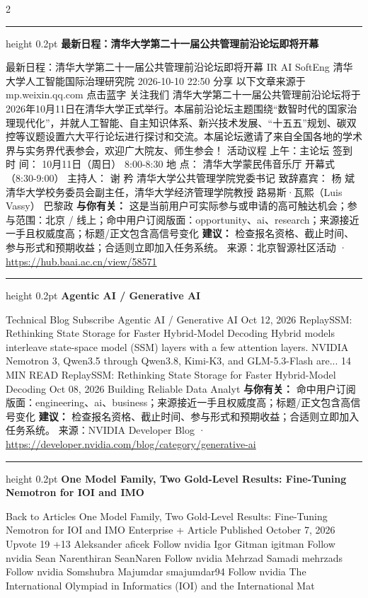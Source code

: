 \documentclass[10.5pt]{ctexart}
\begin{document}
\begin{multicols}{2}
\vspace{2mm}
\hrule height 0.2pt
\vspace{2mm}
{\large\bfseries 最新日程：清华大学第二十一届公共管理前沿论坛即将开幕}\par
最新日程：清华大学第二十一届公共管理前沿论坛即将开幕 IR AI SoftEng 清华大学人工智能国际治理研究院 2026-10-10 22:50 分享 以下文章来源于mp.weixin.qq.com 点击蓝字 关注我们 清华大学第二十一届公共管理前沿论坛将于2026年10月11日在清华大学正式举行。本届前沿论坛主题围绕“数智时代的国家治理现代化”，并就人工智能、自主知识体系、新兴技术发展、“十五五”规划、碳双控等议题设置六大平行论坛进行探讨和交流。本届论坛邀请了来自全国各地的学术界与实务界代表参会，欢迎广大院友、师生参会！ 活动议程 上午：主论坛 签到 时 间： 10月11日（周日） 8:00-8:30 地 点： 清华大学蒙民伟音乐厅 开幕式（8:30-9:00） 主持人： 谢 矜 清华大学公共管理学院党委书记 致辞嘉宾： 杨 斌 清华大学校务委员会副主任，清华大学经济管理学院教授 路易斯·瓦熙（Luis Vassy） 巴黎政
\textbf{与你有关：} 这是当前用户可实际参与或申请的高可触达机会；参与范围：北京 / 线上；命中用户订阅版面：opportunity、ai、research；来源接近一手且权威度高；标题/正文包含高信号变化
\textbf{建议：} 检查报名资格、截止时间、参与形式和预期收益；合适则立即加入任务系统。
{\footnotesize\color{ormuted} 来源：北京智源社区活动 · \url{https://hub.baai.ac.cn/view/58571}}
\vspace{2mm}
\hrule height 0.2pt
\vspace{2mm}
{\large\bfseries Agentic AI / Generative AI}\par
Technical Blog Subscribe Agentic AI / Generative AI Oct 12, 2026 ReplaySSM: Rethinking State Storage for Faster Hybrid-Model Decoding Hybrid models interleave state-space model (SSM) layers with a few attention layers. NVIDIA Nemotron 3, Qwen3.5 through Qwen3.8, Kimi-K3, and GLM-5.3-Flash are... 14 MIN READ ReplaySSM: Rethinking State Storage for Faster Hybrid-Model Decoding Oct 08, 2026 Building Reliable Data Analyt
\textbf{与你有关：} 命中用户订阅版面：engineering、ai、business；来源接近一手且权威度高；标题/正文包含高信号变化
\textbf{建议：} 检查报名资格、截止时间、参与形式和预期收益；合适则立即加入任务系统。
{\footnotesize\color{ormuted} 来源：NVIDIA Developer Blog · \url{https://developer.nvidia.com/blog/category/generative-ai}}
\vspace{2mm}
\hrule height 0.2pt
\vspace{2mm}
{\large\bfseries One Model Family, Two Gold-Level Results: Fine-Tuning Nemotron for IOI and IMO}\par
Back to Articles One Model Family, Two Gold-Level Results: Fine-Tuning Nemotron for IOI and IMO Enterprise + Article Published October 7, 2026 Upvote 19 +13 Aleksander aficek Follow nvidia Igor Gitman igitman Follow nvidia Sean Narenthiran SeanNaren Follow nvidia Mehrzad Samadi mehrzads Follow nvidia Somshubra Majumdar smajumdar94 Follow nvidia The International Olympiad in Informatics (IOI) and the International Mat

\end{multicols}
\end{document}
